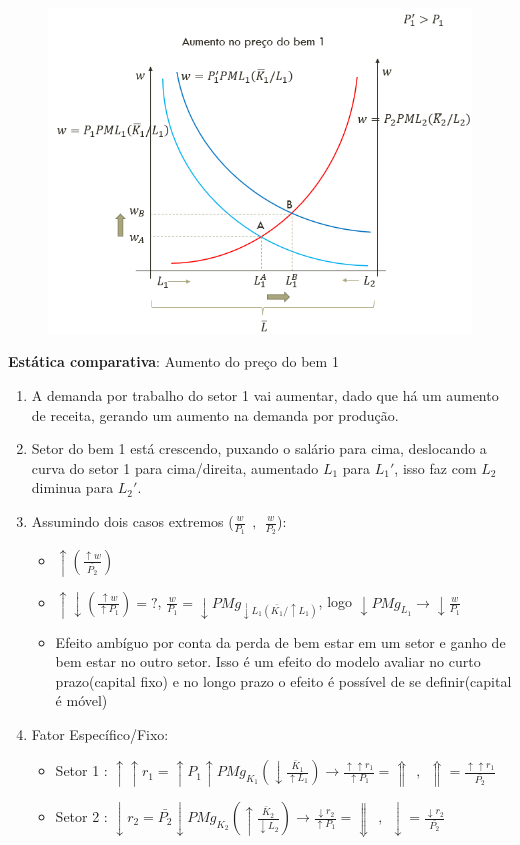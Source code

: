 \documentclass[a4paper,12pt]{article}[abntex2]
\begin{document}
\begin{figure}[H]
    \centering
    \includegraphics[width=0.7\linewidth]{Imagens/a14i4.png}
\end{figure}

\textbf{Estática comparativa}: Aumento do preço do bem 1\begin{enumerate}
    \item A demanda por trabalho do setor 1 vai aumentar, dado que há um aumento de receita, gerando um aumento na demanda por produção. 
    \item Setor do bem 1 está crescendo, puxando o salário para cima, deslocando a curva do setor 1 para cima/direita, aumentado \(L_1\) para \(L_1'\), isso faz com \(L_2\) diminua para \(L_2'\).
    \item Assumindo dois casos extremos (\(\frac{w}{P_1} \ \ , \ \ \frac{w}{P_2}\)):\begin{itemize}
        \item \(\uparrow(\frac{\uparrow w}{\bar{P_2}})\)
        \item \(\uparrow\downarrow(\frac{\uparrow w}{\uparrow{P_1}})=?\), \(\frac{w}{P_1}=\downarrow{PMg_{\downarrow{L_1}(\bar{K_1}/\uparrow{L_1})}}\), logo \(\downarrow PMg_{L_1}\rightarrow \downarrow\frac{w}{P_1}\)
        \item Efeito ambíguo por conta da perda de bem estar em um setor e ganho de bem estar no outro setor. Isso é um efeito do modelo avaliar no curto prazo(capital fixo) e no longo prazo o efeito é possível de se definir(capital é móvel) 
    \end{itemize}
    \item Fator Específico/Fixo:\begin{itemize}
        \item Setor 1 : \(\uparrow\uparrow r_1 = \uparrow P_1 \uparrow PMg_{K_1} \left( \downarrow\frac{\bar{K}_1}{\uparrow L_1} \right) \rightarrow \frac{\uparrow\uparrow r_1}{\uparrow P_1} = \Uparrow \ \ , \ \ \Uparrow=\frac{\uparrow\uparrow r_1}{\bar{P_2}} \) 
        \item Setor 2 : \( \downarrow r_2 =\bar{P_2}  \downarrow PMg_{K_2} \left( \uparrow\frac{\bar{K}_2}{\downarrow L_2} \right) \rightarrow \frac{\downarrow{r_2}}{\uparrow P_1} = \Downarrow   \ \ , \ \ \downarrow=\frac{\downarrow r_2}{\bar{P_2}} \) 
    \end{itemize}
\end{enumerate}
\end{document}
